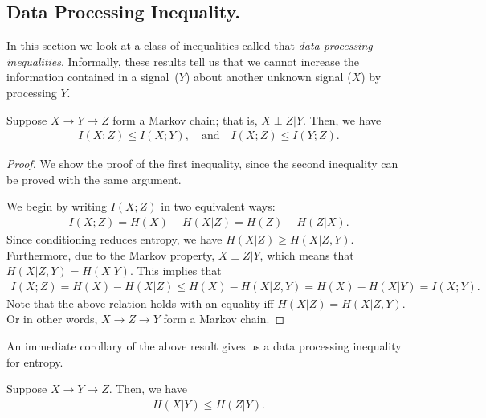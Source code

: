             \subsection{Data Processing Inequality.}
                In this section we look at a class of inequalities called that \emph{data processing inequalities}. Informally, these results tell us that we cannot increase the information contained in a  signal~($Y$)  about another unknown signal ($X$) by processing $Y$. 
                \begin{theorem}
                    \label{thm:dpi-mi}
                    Suppose $X \rightarrow Y \rightarrow Z$ form a Markov chain; that is, $X \perp Z | Y$. Then, we have 
                    \begin{align}
                        I(X; Z) \leq I(X; Y), \quad \text{and} \quad I(X; Z) \leq I(Y;Z). 
                    \end{align}
                \end{theorem}  
                \begin{proof}
                    We show the proof of the first inequality, since the second inequality can be proved with the same argument. 

                    We begin by writing $I(X;Z)$ in two equivalent ways: 
                    \begin{align}
                        I(X; Z) = H(X) - H(X|Z) = H(Z) - H(Z|X). 
                    \end{align}
                    Since conditioning reduces entropy, we have $H(X|Z) \geq H(X|Z, Y)$. Furthermore, due to the Markov property, $X \perp Z|Y$, which means that $H(X|Z, Y) = H(X|Y)$. This implies that 
                    \begin{align}
                        I(X;Z) = H(X) - H(X|Z) \leq H(X) - H(X|Z, Y) = H(X) - H(X|Y) = I(X; Y). 
                    \end{align}
                    Note that the above relation holds with an equality iff $H(X|Z) = H(X|Z, Y)$. Or in other words, $X \rightarrow Z \rightarrow Y$ form a Markov chain. 
                \end{proof}
                An immediate corollary of the above result gives us a data processing inequality for entropy. 
                \begin{corollary}
                    Suppose $X \rightarrow Y \rightarrow Z$. Then, we have 
                    \begin{align}
                        H(X|Y) \leq H(Z|Y). 
                    \end{align}
                \end{corollary}

